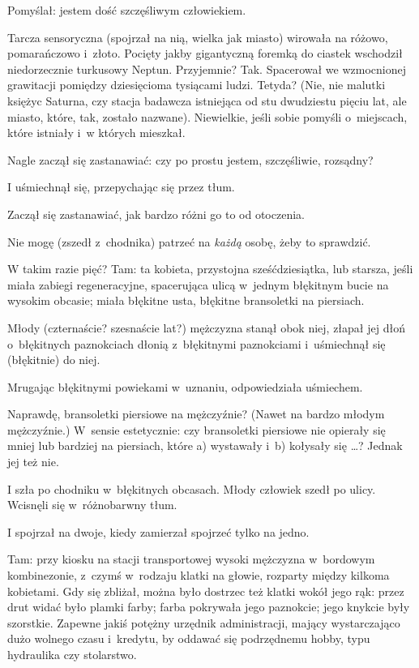 \documentclass[oneside,polish,11pt,rmheadings]{mwbk}
\begin{document}
Pomyślał: jestem dość szczęśliwym człowiekiem. 

Tarcza sensoryczna (spojrzał na nią, wielka jak miasto) wirowała na różowo, pomarańczowo i~złoto. Pocięty jakby gigantyczną foremką do ciastek wschodził niedorzecznie turkusowy Neptun. Przyjemnie? Tak. Spacerował we wzmocnionej grawitacji pomiędzy dziesięcioma tysiącami ludzi. Tetyda? (Nie, nie malutki księżyc Saturna, czy stacja badawcza istniejąca od stu dwudziestu pięciu lat, ale miasto, które, tak, zostało nazwane). Niewielkie, jeśli sobie pomyśli o~miejscach, które istniały i~w których mieszkał. 

Nagle zaczął się zastanawiać: czy po prostu jestem, szczęśliwie, rozsądny? 

I uśmiechnął się, przepychając się przez tłum. 

Zaczął się zastanawiać, jak bardzo różni go to od otoczenia. 

Nie mogę (zszedł z~chodnika) patrzeć na \textit{każdą} osobę, żeby to sprawdzić. 

W takim razie pięć? Tam: ta kobieta, przystojna sześćdziesiątka, lub starsza, jeśli miała zabiegi regeneracyjne, spacerująca ulicą w~jednym błękitnym bucie na wysokim obcasie; miała błękitne usta, błękitne bransoletki na piersiach. 

Młody (czternaście? szesnaście lat?) mężczyzna stanął obok niej, złapał jej dłoń o~błękitnych paznokciach dłonią z~błękitnymi paznokciami i~uśmiechnął się (błękitnie) do niej. 

Mrugając błękitnymi powiekami w~uznaniu, odpowiedziała uśmiechem. 

Naprawdę, bransoletki piersiowe na mężczyźnie? (Nawet na bardzo młodym mężczyźnie.) W~sensie estetycznie: czy bransoletki piersiowe nie opierały się mniej lub bardziej na piersiach, które a) wystawały i~b) kołysały się \ldots ? Jednak jej też nie. 

I szła po chodniku w~błękitnych obcasach. Młody człowiek szedł po ulicy. Wcisnęli się w~różnobarwny tłum. 

I spojrzał na dwoje, kiedy zamierzał spojrzeć tylko na jedno. 

Tam: przy kiosku na stacji transportowej wysoki mężczyzna w~bordowym kombinezonie, z~czymś w~rodzaju klatki na głowie, rozparty między kilkoma kobietami. Gdy się zbliżał, można było dostrzec też klatki wokół jego rąk: przez drut widać było plamki farby; farba pokrywała jego paznokcie; jego knykcie były szorstkie. Zapewne jakiś potężny urzędnik administracji, mający wystarczająco dużo wolnego czasu i~kredytu, by oddawać się podrzędnemu hobby, typu hydraulika czy stolarstwo. 
\end{document}
